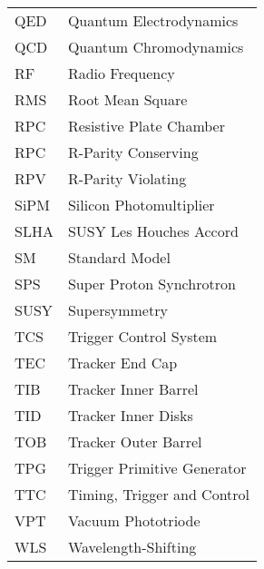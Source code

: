 \begin{longtable}[l]{@{}l@{\ \ \ \ \ \ \ \ \ \ \ \ }l}
QED        & Quantum Electrodynamics \\
QCD        & Quantum Chromodynamics \\
RF         & Radio Frequency \\
RMS        & Root Mean Square \\
RPC        & Resistive Plate Chamber \\
RPC        & R-Parity Conserving \\
RPV        & R-Parity Violating \\
SiPM       & Silicon Photomultiplier \\
SLHA       & SUSY Les Houches Accord \\
SM         & Standard Model \\
SPS        & Super Proton Synchrotron \\
SUSY       & Supersymmetry \\
TCS        & Trigger Control System \\
TEC        & Tracker End Cap \\
TIB        & Tracker Inner Barrel \\
TID        & Tracker Inner Disks \\
TOB        & Tracker Outer Barrel \\
TPG        & Trigger Primitive Generator \\
TTC        & Timing, Trigger and Control \\
VPT        & Vacuum Phototriode \\
WLS        & Wavelength-Shifting \\
\end{longtable}